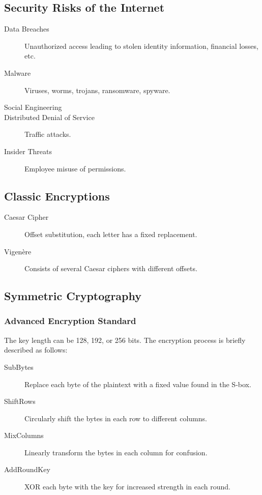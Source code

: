 \documentclass[11pt,journal,compsoc]{IEEEtran}
\begin{document}
\subsection{Security Risks of the Internet}

\begin{description}
    \item[Data Breaches] Unauthorized access leading to stolen identity information, financial losses, etc.
    \item[Malware] Viruses, worms, trojans, ransomware, spyware.
    \item[Social Engineering]
    \item[Distributed Denial of Service] Traffic attacks.
    \item[Insider Threats] Employee misuse of permissions.
\end{description}

\subsection{Classic Encryptions}

\begin{description}
    \item[Caesar Cipher] Offset substitution, each letter has a fixed replacement.
    \item[Vigenère] Consists of several Caesar ciphers with different offsets.
\end{description}


\subsection{Symmetric Cryptography}


\subsubsection{Advanced Encryption Standard}

The key length can be 128, 192, or 256 bits. The encryption process is briefly described as follows:

\begin{description}
    \item[SubBytes] Replace each byte of the plaintext with a fixed value found in the S-box.
    
    \item[ShiftRows] Circularly shift the bytes in each row to different columns.
    
    \item[MixColumns] Linearly transform the bytes in each column for confusion.
    
    \item[AddRoundKey] XOR each byte with the key for increased strength in each round.
\end{description}
\end{document}
